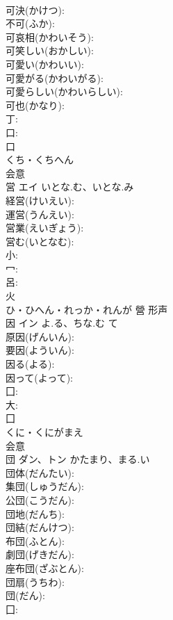 \documentclass[8pt]{extreport}
\begin{document}
\begin{CJK}{UTF8}{min}
\\	可決(かけつ): 
\\	不可(ふか): 
\\	可哀相(かわいそう): 
\\	可笑しい(おかしい): 
\\	可愛い(かわいい): 
\\	可愛がる(かわいがる): 
\\	可愛らしい(かわいらしい): 
\\	可也(かなり): 
\\	丁: 
\\	口: 
\\	口	
\\	くち・くちへん	
\\	会意 
\\	営	エイ	いとな.む、いとな.み		
\\	経営(けいえい): 
\\	運営(うんえい): 
\\	営業(えいぎょう): 
\\	営む(いとなむ): 
\\	小: 
\\	冖: 
\\	呂: 
\\	火	
\\	ひ・ひへん・れっか・れんが	營	形声 
\\	因	イン	よ.る、ちな.む	て	
\\	原因(げんいん): 
\\	要因(よういん): 
\\	因る(よる): 
\\	因って(よって): 
\\	囗: 
\\	大: 
\\	囗	
\\	くに・くにがまえ	
\\	会意 
\\	団	ダン、トン	かたまり、まる.い		
\\	団体(だんたい): 
\\	集団(しゅうだん): 
\\	公団(こうだん): 
\\	団地(だんち): 
\\	団結(だんけつ): 
\\	布団(ふとん): 
\\	劇団(げきだん): 
\\	座布団(ざぶとん): 
\\	団扇(うちわ): 
\\	団(だん): 
\\	囗: 

\end{CJK}
\end{document}
